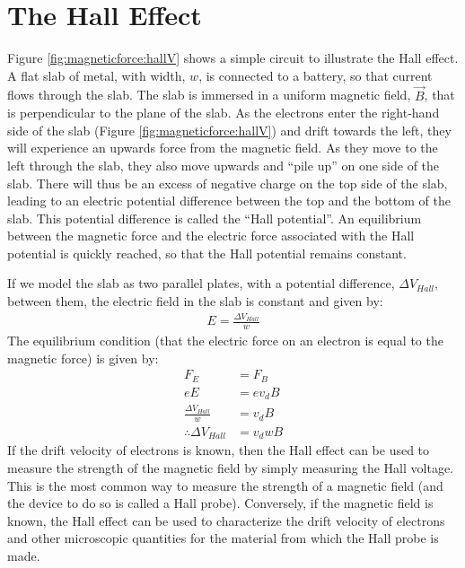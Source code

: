 \section{The Hall Effect}
Figure \ref{fig:magneticforce:hallV} shows a simple circuit to illustrate the Hall effect. A flat slab of metal, with width, $w$, is connected to a battery, so that current flows through the slab. The slab is immersed in a uniform magnetic field, $\vec B$, that is perpendicular to the plane of the slab.
As the electrons enter the right-hand side of the slab (Figure \ref{fig:magneticforce:hallV}) and drift towards the left, they will experience an upwards force from the magnetic field. As they move to the left through the slab, they also move upwards and ``pile up'' on one side of the slab. There will thus be an excess of negative charge on the top side of the slab, leading to an electric potential difference between the top and the bottom of the slab. This potential difference is called the ``Hall potential''. An equilibrium between the magnetic force and the electric force associated with the Hall potential is quickly reached, so that the Hall potential remains constant.

If we model the slab as two parallel plates, with a potential difference, $\Delta V_{Hall}$, between them, the electric field in the slab is constant and given by:
\begin{align*}
E= \frac{\Delta V_{Hall}}{w}
\end{align*}
The equilibrium condition (that the electric force on an electron is equal to the magnetic force) is given by:
\begin{align*}
F_E &= F_B\\
eE &= ev_dB\\
\frac{\Delta V_{Hall}}{w} &= v_d B\\
\therefore \Delta V_{Hall}&= v_d wB
\end{align*}
If the drift velocity of electrons is known, then the Hall effect can be used to measure the strength of the magnetic field by simply measuring the Hall voltage. This is the most common way to measure the strength of a magnetic field (and the device to do so is called a Hall probe). Conversely, if the magnetic field is known, the Hall effect can be used to characterize the drift velocity of electrons and other microscopic quantities for the material from which the Hall probe is made.

